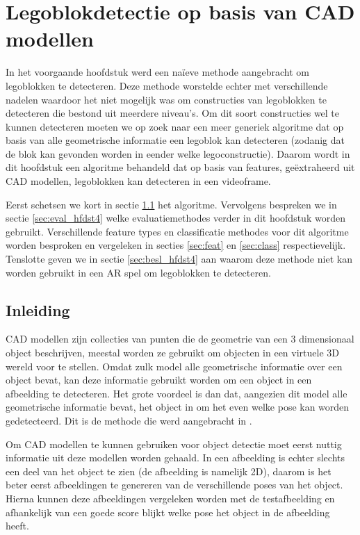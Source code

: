 \chapter{Legoblokdetectie op basis van CAD modellen}
\label{hoofdstuk:3}
In het voorgaande hoofdstuk werd een na\"ieve methode aangebracht om legoblokken te detecteren. Deze methode worstelde echter met verschillende nadelen waardoor het niet mogelijk was om constructies van legoblokken te detecteren die bestond uit meerdere niveau's. Om dit soort constructies wel te kunnen detecteren moeten we op zoek naar een meer generiek algoritme dat op basis van alle geometrische informatie een legoblok kan detecteren (zodanig dat de blok kan gevonden worden in eender welke legoconstructie). Daarom wordt in dit hoofdstuk een algoritme behandeld dat op basis van features, ge\"extraheerd uit CAD modellen, legoblokken kan detecteren in een videoframe.

Eerst schetsen we kort in sectie \ref{sec:inl_hfdst4} het algoritme. Vervolgens bespreken we in sectie \ref{sec:eval_hfdst4} welke evaluatiemethodes verder in dit hoofdstuk worden gebruikt. Verschillende feature types en classificatie methodes voor dit algoritme worden besproken en vergeleken in secties \ref{sec:feat} en \ref{sec:class} respectievelijk. Tenslotte geven we in sectie \ref{sec:besl_hfdst4} aan waarom deze methode niet kan worden gebruikt in een AR spel om legoblokken te detecteren.

\section{Inleiding} \label{sec:inl_hfdst4}
CAD modellen zijn collecties van punten die de geometrie van een 3 dimensionaal object beschrijven, meestal worden ze gebruikt om objecten in een virtuele 3D wereld voor te stellen. Omdat zulk model alle geometrische informatie over een object bevat, kan deze informatie gebruikt worden om een object in een afbeelding te detecteren. Het grote voordeel is dan dat, aangezien dit model alle geometrische informatie bevat, het object in om het even welke pose kan worden gedetecteerd. Dit is de methode die werd aangebracht in \cite{aubry2014seeing}.

Om CAD modellen te kunnen gebruiken voor object detectie moet eerst nuttig informatie uit deze modellen worden gehaald. In een afbeelding is echter slechts een deel van het object te zien (de afbeelding is namelijk 2D),  daarom is het beter eerst afbeeldingen te genereren van de verschillende poses van het object. Hierna kunnen deze afbeeldingen vergeleken worden met de testafbeelding en afhankelijk van een goede score blijkt welke pose het object in de afbeelding heeft.

